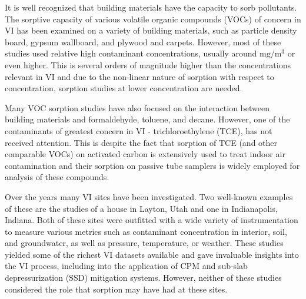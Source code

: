 It is well recognized that building materials have the capacity to sorb pollutants.
The sorptive capacity of various volatile organic compounds (VOCs) of concern in VI has been examined on a variety of building materials, such as particle density board\cite{wang_correlation_2008}, gypsum wallboard\cite{xu_determination_2012}, and plywood and carpets\cite{bodalal_method_2000}.
However, most of these studies used relative high contaminant concentrations, usually around $\mathrm{mg/m^3}$\cite{wang_correlation_2008} or even higher.
This is several orders of magnitude higher than the concentrations relevant in VI and due to the non-linear nature of sorption with respect to concentration, sorption studies at lower concentration are needed.\par

Many VOC sorption studies have also focused on the interaction between building materials and formaldehyde\cite{xu_determination_2012}, toluene, and decane\cite{bodalal_method_2000}.
However, one of the contaminants of greatest concern in VI - trichloroethylene (TCE), has not received attention.
This is despite the fact that sorption of TCE (and other comparable VOCs) on activated carbon is extensively used to treat indoor air contamination and their sorption on passive tube samplers is widely employed for analysis of these compounds\cite{u.s._environmental_protection_agency_oswer_2015}.\par


Over the years many VI sites have been investigated.
Two well-known examples of these are the studies of a house in Layton, Utah and one in Indianapolis, Indiana.
Both of these sites were outfitted with a wide variety of instrumentation to measure various metrics such as contaminant concentration in interior, soil, and groundwater, as well as pressure, temperature, or weather.
These studies yielded some of the richest VI datasets available and gave invaluable insights into the VI process, including into the application of CPM\cite{holton_long-term_2015} and sub-slab depressurization (SSD) mitigation systems\cite{lutes_comparing_2015,u.s._environmental_protection_agency_assessment_2015}.
However, neither of these studies considered the role that sorption may have had at these sites.\par

